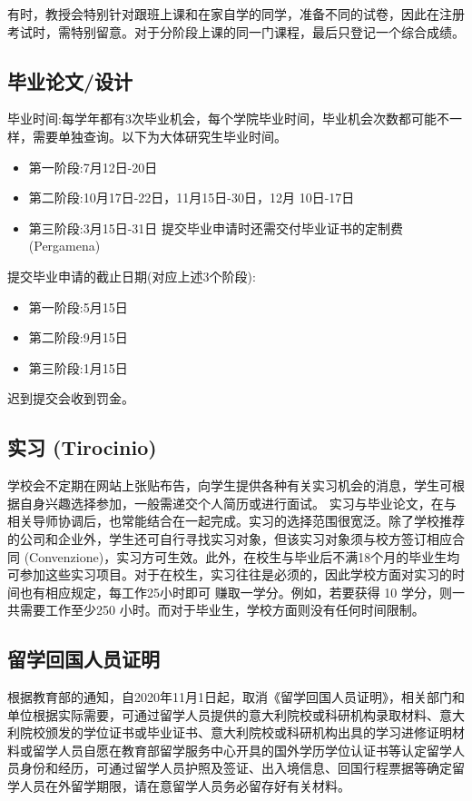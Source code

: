 有时，教授会特别针对跟班上课和在家自学的同学，准备不同的试卷，因此在注册考试时，需特别留意。对于分阶段上课的同一门课程，最后只登记一个综合成绩。

\subsection{毕业论文/设计}

毕业时间:每学年都有3次毕业机会，每个学院毕业时间，毕业机会次数都可能不一样，需要单独查询。以下为大体研究生毕业时间。
\begin{itemize}
\item 第一阶段:7月12日-20日
\item 第二阶段:10月17日-22日，11月15日-30日，12月 10日-17日
\item 第三阶段:3月15日-31日
提交毕业申请时还需交付毕业证书的定制费 (Pergamena) 
\end{itemize}

\noindent 提交毕业申请的截止日期(对应上述3个阶段): 
\begin{itemize}
\item 第一阶段:5月15日
\item 第二阶段:9月15日
\item 第三阶段:1月15日 
\end{itemize}
迟到提交会收到罚金。

\subsection{实习 (Tirocinio)}
学校会不定期在网站上张贴布告，向学生提供各种有关实习机会的消息，学生可根据自身兴趣选择参加，一般需递交个人简历或进行面试。 实习与毕业论文，在与相关导师协调后，也常能结合在一起完成。实习的选择范围很宽泛。除了学校推荐的公司和企业外，学生还可自行寻找实习对象，但该实习对象须与校方签订相应合同 (Convenzione)，实习方可生效。此外，在校生与毕业后不满18个月的毕业生均可参加这些实习项目。对于在校生，实习往往是必须的，因此学校方面对实习的时间也有相应规定，每工作25小时即可 
赚取一学分。例如，若要获得 10 学分，则一共需要工作至少250 小时。而对于毕业生，学校方面则没有任何时间限制。 
\subsection{留学回国人员证明}
根据教育部的通知，自2020年11月1日起，取消《留学回国人员证明》，相关部门和单位根据实际需要，可通过留学人员提供的意大利院校或科研机构录取材料、意大利院校颁发的学位证书或毕业证书、意大利院校或科研机构出具的学习进修证明材料或留学人员自愿在教育部留学服务中心开具的国外学历学位认证书等认定留学人员身份和经历，可通过留学人员护照及签证、出入境信息、回国行程票据等确定留学人员在外留学期限，请在意留学人员务必留存好有关材料。


